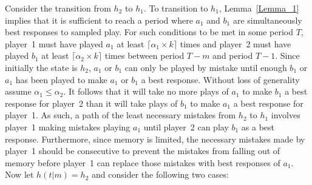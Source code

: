 \documentclass[11.5pt]{article}
\begin{document}
Consider the transition from $h_2$ to $h_1$. To transition to $h_1$, Lemma~\ref{Lemma_1} implies that it is sufficient to reach a period where $a_1$ and $b_1$ are simultaneously best responses to sampled play. For such conditions to be met in some period $T$, player~1 must have played $a_1$ at least $\lceil \alpha_1 \times k \rceil$ times and player~2 must have played $b_1$ at least $\lceil \alpha_2 \times k \rceil$ times between period $T-m$ and period $T-1$. Since initially the state is $h_2$, $a_1$ or $b_1$ can only be played by mistake until enough $b_1$ or $a_1$ has been played to make $a_1$ or $b_1$ a best response. Without loss of generality assume $\alpha_1 \leq \alpha_2$. It follows that it will take no more plays of $a_1$ to make $b_1$ a best response for player~2 than it will take plays of $b_1$ to make $a_1$ a best response for player~1. As such, a path of the least necessary mistakes from $h_2$ to $h_1$ involves player~1 making mistakes playing $a_1$ until player~2 can play $b_1$ as a best response. Furthermore, since memory is limited, the necessary mistakes made by player~1 should be consecutive to prevent the mistakes from falling out of memory before player~1 can replace those mistakes with best responses of $a_1$. Now let $h(t|m) = h_2$ and consider the following two cases:
%
\end{document}
